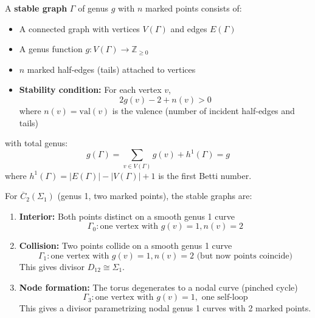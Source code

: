 \begin{definition}\label{def:stable-graph}
A \textbf{stable graph} $\Gamma$ of genus $g$ with $n$ marked points consists of:
\begin{itemize}
\item A connected graph with vertices $V(\Gamma)$ and edges $E(\Gamma)$
\item A genus function $g: V(\Gamma) \to \mathbb{Z}_{\geq 0}$
\item $n$ marked half-edges (tails) attached to vertices
\item \textbf{Stability condition:} For each vertex $v$, 
$$2g(v) - 2 + n(v) > 0$$
where $n(v) = \text{val}(v)$ is the valence (number of incident half-edges and tails)
\end{itemize}
with total genus:
$$g(\Gamma) = \sum_{v \in V(\Gamma)} g(v) + h^1(\Gamma) = g$$
where $h^1(\Gamma) = |E(\Gamma)| - |V(\Gamma)| + 1$ is the first Betti number.
\end{definition}

\begin{example}[Stable Graphs at Genus 1, $n=2$]\label{ex:stable-graphs-g1-n2}
For $\overline{C}_2(\Sigma_1)$ (genus 1, two marked points), the stable graphs are:

\begin{enumerate}
\item \textbf{Interior:} Both points distinct on a smooth genus 1 curve
$$\Gamma_0: \text{one vertex with } g(v) = 1, n(v) = 2$$

\item \textbf{Collision:} Two points collide on a smooth genus 1 curve  
$$\Gamma_1: \text{one vertex with } g(v) = 1, n(v) = 2 \text{ (but now points coincide)}$$
This gives divisor $D_{12} \cong \Sigma_1$.

\item \textbf{Node formation:} The torus degenerates to a nodal curve (pinched cycle)
$$\Gamma_3: \text{one vertex with } g(v) = 1, \text{ one self-loop}$$
This gives a divisor parametrizing nodal genus 1 curves with 2 marked points.
\end{enumerate}
\end{example}


